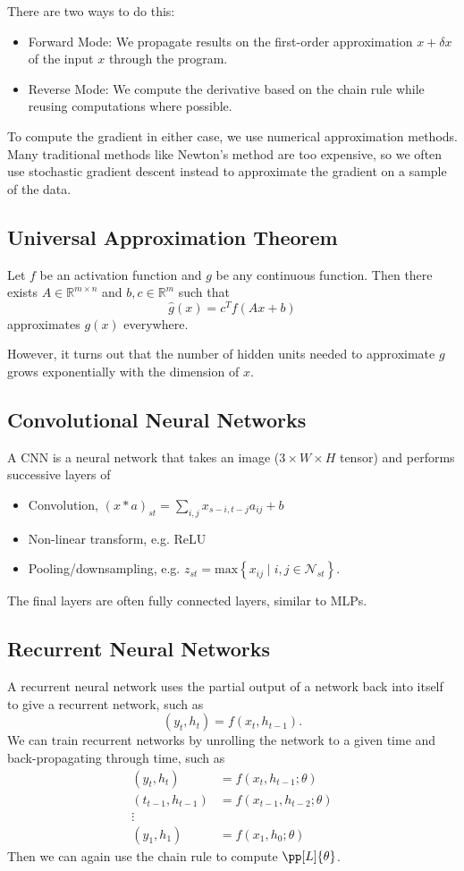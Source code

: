 \documentclass[11pt]{article}
\begin{document}
There are two ways to do this:
\begin{itemize}
    \item Forward Mode: We propagate results on the first-order approximation $x + \delta x$ of the input $x$ through the program.
    \item Reverse Mode: We compute the derivative based on the chain rule while reusing computations where possible.
\end{itemize}

To compute the gradient in either case, we use numerical approximation methods. Many traditional methods like Newton's method are too expensive, so we often use stochastic gradient descent instead to approximate the gradient on a sample of the data. 

\subsection{Universal Approximation Theorem}
Let $f$ be an activation function and $g$ be any continuous function. Then there exists $A \in \mathbb{R}^{m \times n}$ and $b, c \in \mathbb{R}^m$ such that 
\[ \hat{g}(x) = c^T f(Ax + b) \] 
approximates $g(x)$ everywhere. \par
However, it turns out that the number of hidden units needed to approximate $g$ grows exponentially with the dimension of $x$.

\subsection{Convolutional Neural Networks} 
A CNN is a neural network that takes an image ($3 \times W \times H$ tensor) and performs successive layers of 
\begin{itemize}
    \item Convolution, $(x * a)_{st} = \sum_{i,j} x_{s-i, t-j}a_{ij} + b$
    \item Non-linear transform, e.g. ReLU
    \item Pooling/downsampling, e.g. $z_{st} = \mathrm{max}\left\{ x_{ij} \mid i, j \in \mathcal{N}_{st} \right\}$. 
\end{itemize}
The final layers are often fully connected layers, similar to MLPs. 

\subsection{Recurrent Neural Networks} 
A recurrent neural network uses the partial output of a network back into itself to give a recurrent network, such as 
\[ (y_t, h_t) = f(x_t, h_{t-1}). \] 
We can train recurrent networks by unrolling the network to a given time and back-propagating through time, such as 
\begin{align*}
    (y_t, h_t) &= f(x_t, h_{t-1}; \theta) \\
    (t_{t-1}, h_{t-1}) &= f(x_{t-1}, h_{t-2}; \theta) \\ 
    \vdots \\
    (y_1, h_1) &= f(x_1, h_0; \theta)
\end{align*}
Then we can again use the chain rule to compute $\pp[L]{\theta}$. \par 
\end{document}
